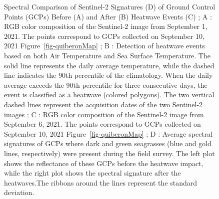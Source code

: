 \documentclass[
  number]{elsarticle}
\begin{document}
\label{cell-fig-S2_comparison}
\begin{figure}[H]


\caption{\label{fig-S2_comparison}Spectral Comparison of Sentinel-2
Signatures (D) of Ground Control Points (GCPs) Before (A) and After (B)
Heatwave Events (C) ; A : RGB color composition of the Sentinel-2 image
from September 1, 2021. The points correspond to GCPs collected on
September 10, 2021 Figure~\ref{fig-quiberonMap} ; B : Detection of
heatwave events based on both Air Temperature and Sea Surface
Temperature. The solid line represents the daily average temperature,
while the dashed line indicates the 90th percentile of the climatology.
When the daily average exceeds the 90th percentile for three consecutive
days, the event is classified as a heatwave (colored polygons). The two
vertical dashed lines represent the acquisition dates of the two
Sentinel-2 images ; C : RGB color composition of the Sentinel-2 image
from September 6, 2021. The points correspond to GCPs collected on
September 10, 2021 Figure~\ref{fig-quiberonMap} ; D : Average spectral
signatures of GCPs where dark and green seagrasses (blue and gold lines,
respectively) were present during the field survey. The left plot shows
the reflectance of these GCPs before the heatwave impact, while the
right plot shows the spectral signature after the heatwaves.The ribbons
around the lines represent the standard deviation.}

\end{figure}%
\end{document}
